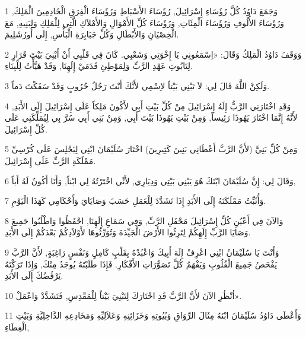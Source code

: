\par 1 وَجَمَعَ دَاوُدُ كُلَّ رُؤَسَاءِ إِسْرَائِيلَ, رُؤَسَاءَ الأَسْبَاطِ وَرُؤَسَاءَ الْفِرَقِ الْخَادِمِينَ الْمَلِكَ, وَرُؤَسَاءَ الأُلُوفِ وَرُؤَسَاءَ الْمِئَاتِ, وَرُؤَسَاءَ كُلِّ الأَمْوَالِ وَالأَمْلاَكِ الَّتِي لِلْمَلِكِ وَلِبَنِيهِ, مَعَ الْخِصْيَانِ وَالأَبْطَالِ وَكُلِّ جَبَابِرَةِ الْبَأْسِ, إِلَى أُورُشَلِيمَ.
\par 2 وَوَقَفَ دَاوُدُ الْمَلِكُ وَقَالَ: «اِسْمَعُونِي يَا إِخْوَتِي وَشَعْبِي. كَانَ فِي قَلْبِي أَنْ أَبْنِيَ بَيْتَ قَرَارٍ لِتَابُوتِ عَهْدِ الرَّبِّ وَلِمَوْطِئِ قَدَمَيْ إِلَهِنَا, وَقَدْ هَيَّأْتُ لِلْبِنَاءِ.
\par 3 وَلَكِنَّ اللَّهَ قَالَ لِي: لاَ تَبْنِي بَيْتاً لاِسْمِي لأَنَّكَ أَنْتَ رَجُلُ حُرُوبٍ وَقَدْ سَفَكْتَ دَماً.
\par 4 وَقَدِ اخْتَارَنِي الرَّبُّ إِلَهُ إِسْرَائِيلَ مِنْ كُلِّ بَيْتِ أَبِي لأَكُونَ مَلِكاً عَلَى إِسْرَائِيلَ إِلَى الأَبَدِ, لأَنَّهُ إِنَّمَا اخْتَارَ يَهُوذَا رَئِيساً, وَمِنْ بَيْتِ يَهُوذَا بَيْتَ أَبِي, وَمِنْ بَنِي أَبِي سُرَّ بِي لِيُمَلِّكَنِي عَلَى كُلِّ إِسْرَائِيلَ.
\par 5 وَمِنْ كُلِّ بَنِيَّ (لأَنَّ الرَّبَّ أَعْطَانِي بَنِينَ كَثِيرِينَ) اخْتَارَ سُلَيْمَانَ ابْنِي لِيَجْلِسَ عَلَى كُرْسِيِّ مَمْلَكَةِ الرَّبِّ عَلَى إِسْرَائِيلَ.
\par 6 وَقَالَ لِي: إِنَّ سُلَيْمَانَ ابْنَكَ هُوَ يَبْنِي بَيْتِي وَدِيَارِي, لأَنِّي اخْتَرْتُهُ لِي ابْناً, وَأَنَا أَكُونُ لَهُ أَباً,
\par 7 وَأُثَبِّتُ مَمْلَكَتَهُ إِلَى الأَبَدِ إِذَا تَشَدَّدَ لِلْعَمَلِ حَسَبَ وَصَايَايَ وَأَحْكَامِي كَهَذَا الْيَوْمِ.
\par 8 وَالآنَ فِي أَعْيُنِ كُلِّ إِسْرَائِيلَ مَحْفَلِ الرَّبِّ, وَفِي سَمَاعِ إِلَهِنَا, احْفَظُوا وَاطْلُبُوا جَمِيعَ وَصَايَا الرَّبِّ إِلَهِكُمْ لِتَرِثُوا الأَرْضَ الْجَيِّدَةَ وَتُوَرِّثُوهَا لأَوْلاَدِكُمْ بَعْدَكُمْ إِلَى الأَبَدِ.
\par 9 وَأَنْتَ يَا سُلَيْمَانُ ابْنِي اعْرِفْ إِلَهَ أَبِيكَ وَاعْبُدْهُ بِقَلْبٍ كَامِلٍ وَنَفْسٍ رَاغِبَةٍ, لأَنَّ الرَّبَّ يَفْحَصُ جَمِيعَ الْقُلُوبِ وَيَفْهَمُ كُلَّ تَصَوُّرَاتِ الأَفْكَارِ. فَإِذَا طَلَبْتَهُ يُوجَدُ مِنْكَ, وَإِذَا تَرَكْتَهُ يَرْفُضُكَ إِلَى الأَبَدِ.
\par 10 اُنْظُرِ الآنَ لأَنَّ الرَّبَّ قَدِ اخْتَارَكَ لِتَبْنِيَ بَيْتاً لِلْمَقْدِسِ, فَتَشَدَّدْ وَاعْمَلْ».
\par 11 وَأَعْطَى دَاوُدُ سُلَيْمَانَ ابْنَهُ مِثَالَ الرِّوَاقِ وَبُيُوتِهِ وَخَزَائِنِهِ وَعَلاَلِيِّهِ وَمَخَادِعِهِ الدَّاخِلِيَّةِ وَبَيْتِ الْغِطَاءِ,
